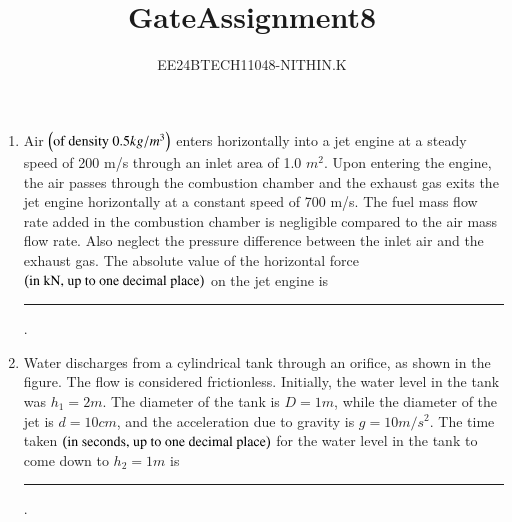 \documentclass[journal]{IEEEtran}
\numberwithin{equation}{enumi}
\numberwithin{figure}{enumi}
\begin{document}


\title{GateAssignment8}
\author{EE24BTECH11048-NITHIN.K} 
{\let\newpage\relax\maketitle}
\begin{enumerate}
\item Air $\left(\text{of density 0.5} kg/m^3\right)$ enters horizontally into a jet engine at a steady speed of 200 m/s through an inlet area of 1.0 $m^2$. Upon entering the engine, the air passes through the combustion chamber and the exhaust gas exits the jet engine horizontally at a constant speed of 700 m/s. The fuel mass flow rate added in the combustion chamber is negligible compared to the air mass flow rate. Also neglect the pressure difference between the inlet air and the exhaust gas. The absolute value of the horizontal force $\left(\text{in kN, up to one decimal place}\right)$ on the jet engine is \rule{1cm}{0.4pt}.
\item Water discharges from a cylindrical tank through an orifice, as shown in the figure. The flow is considered frictionless. Initially, the water level in the tank was $h_1 = 2 m$. The diameter of the tank is $D = 1 m$, while the diameter of the jet is $d = 10 cm$, and the acceleration due to gravity is $g = 10m/s^2$. The time taken $\left(\text{in seconds, up to one decimal place}\right)$ for the water level in the tank to come down to $h_2 = 1m$ is \rule{1cm}{0.4pt}.
	\begin{figure}[H]
		\centering
\end{figure}
\end{enumerate}
\end{document}
